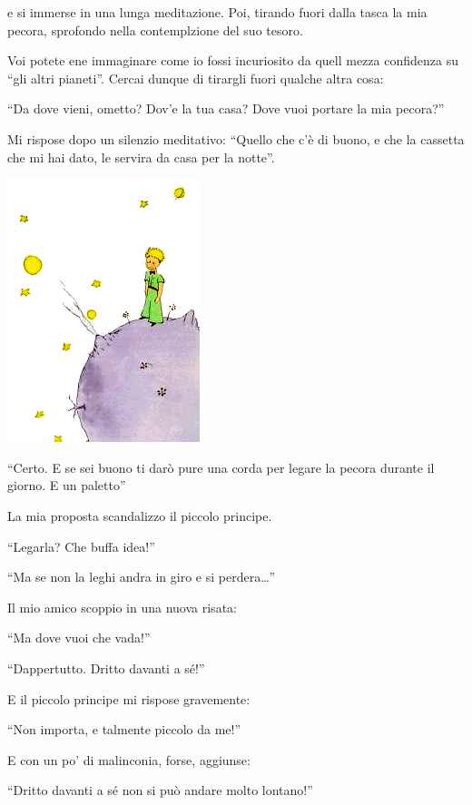 \documentclass[11pt]{scrbook}
\begin{document}
e si immerse in una lunga meditazione. Poi, tirando fuori dalla tasca la
mia pecora, sprofondo nella contemplzione del suo tesoro.

Voi potete ene immaginare come io fossi incuriosito da quell mezza
confidenza su ``gli altri pianeti''. Cercai dunque di tirargli fuori
qualche altra cosa:

``Da dove vieni, ometto? Dov'e la tua casa? Dove vuoi portare la mia
pecora?''

Mi rispose dopo un silenzio meditativo: ``Quello che c'è di buono, e che
la cassetta che mi hai dato, le servira da casa per la notte''.

\begin{center}
\includegraphics{./img/estrellas.png}

\end{center}

``Certo. E se sei buono ti darò pure una corda per legare la pecora
durante il giorno. E un paletto''

La mia proposta scandalizzo il piccolo principe.

``Legarla? Che buffa idea!''

``Ma se non la leghi andra in giro e si perdera\ldots{}''

Il mio amico scoppio in una nuova risata:

``Ma dove vuoi che vada!''

``Dappertutto. Dritto davanti a sé!''

E il piccolo principe mi rispose gravemente:

``Non importa, e talmente piccolo da me!''

E con un po' di malinconia, forse, aggiunse:

``Dritto davanti a sé non si può andare molto lontano!''
\end{document}
